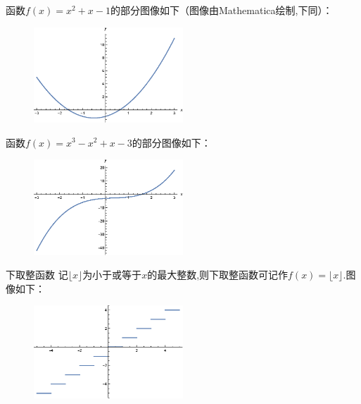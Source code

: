 \documentclass[lang=cn,math=cm,chinesefont=nofont,11pt,scheme=chinese,twocol]{elegantbook}
\begin{document}
\begin{example}
  函数$f(x)=x^2+x-1$的部分图像如下（图像由Mathematica绘制,下同）：
\end{example}

\begin{figure}[h]
  \centering
  \includegraphics[width=0.5\textwidth]{image/2.1.5function1.eps}
  \label{img:2.1.5function1}
\end{figure}

\begin{example}
  函数$f(x)=x^3-x^2+x-3$的部分图像如下：
\end{example}

\begin{figure}[h]
  \centering
  \includegraphics[width=0.5\textwidth]{image/2.1.5function2.eps}
  \label{img:2.1.5function2}
\end{figure}

\begin{example}{下取整函数}
  记$\lfloor x\rfloor $为小于或等于$x$的最大整数,则下取整函数可记作$f(x)=\lfloor x\rfloor$.图像如下：
\end{example}

\begin{figure}[h]
  \centering
  \includegraphics[width=0.5\textwidth]{image/2.1.5function5.eps}
  \label{img:2.1.5function5}
\end{figure}
\end{document}
